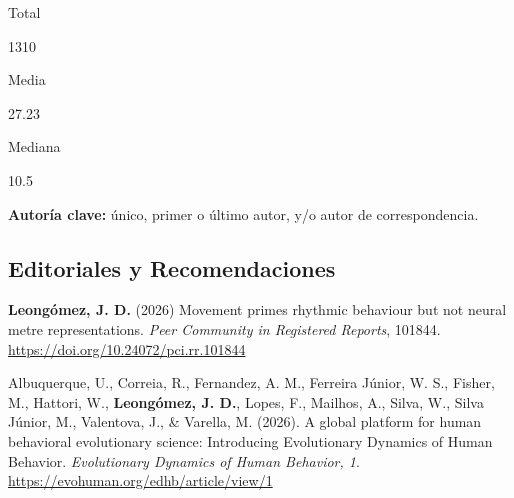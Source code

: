 \documentclass[11pt,a4paper,]{awesome-cv}
\begin{document}
\begin{tcolorbox}[enhanced,
  on line,
  boxsep=4pt, left=0pt,right=0pt,top=0pt,bottom=0pt,
  colframe=white,colback=teal,
  hyperurl={https://scholar.google.com/citations?user=8Q0jKHsAAAAJ}]
  \begin{minipage}[c]{0.325\linewidth}
    \begin{center}
      \begin{small} Total \end{small}
      \begin{LARGE} 1310 \end{LARGE}
    \end{center}
  \end{minipage}
  \begin{minipage}[c]{0.325\linewidth}
    \begin{center}
      \begin{small} Media \end{small}
      \begin{LARGE} 27.23 \end{LARGE}
    \end{center}
  \end{minipage}
  \begin{minipage}[c]{0.325\linewidth}
    \begin{center}
      \begin{small} Mediana \end{small}
      \begin{LARGE} 10.5 \end{LARGE}
    \end{center}
  \end{minipage}
\end{tcolorbox}

\begin{importantnote}
  \textcolor{teal}{\faStar} \textbf{Autoría clave:} único, primer o último autor, y/o autor de correspondencia.
\end{importantnote}

\subsection{\texorpdfstring{\textbf{Editoriales y Recomendaciones}}{}}\label{section}

\begingroup
  \footnotesize
  \setlength{\parindent}{-0.5in}
  \setlength{\leftskip}{0.5in}

\textcolor{teal}{\faStar} \textbf{Leongómez, J. D.} (2026) Movement
primes rhythmic behaviour but not neural metre representations.
\emph{Peer Community in Registered Reports}, 101844.
\url{https://doi.org/10.24072/pci.rr.101844}

Albuquerque, U., Correia, R., Fernandez, A. M., Ferreira Júnior, W. S.,
Fisher, M., Hattori, W., \textbf{Leongómez, J. D.}, Lopes, F., Mailhos,
A., Silva, W., Silva Júnior, M., Valentova, J., \& Varella, M. (2026). A
global platform for human behavioral evolutionary science: Introducing
Evolutionary Dynamics of Human Behavior. \emph{Evolutionary Dynamics of
Human Behavior, 1}. \url{https://evohuman.org/edhb/article/view/1}
\end{document}
